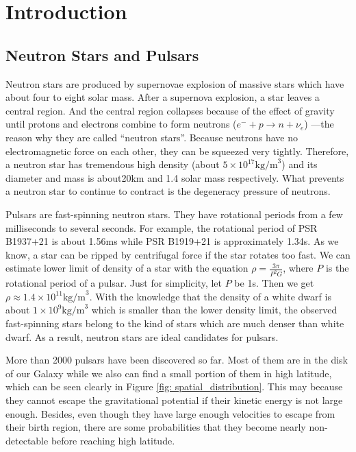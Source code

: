 \documentclass[12pt]{report}
\begin{document}
\listoftables


\chapter{Introduction}   	   
  \section{Neutron Stars and Pulsars}
    Neutron stars are produced by supernovae explosion of massive stars which have about four 
    to eight solar mass. After a supernova explosion, a star leaves a central region. 
    And the central region collapses because of the effect of 
    gravity until protons and electrons combine to form neutrons 
    ($e^{-}+p\rightarrow n+\nu_{e}$) ---the reason why they are called ``neutron stars''.  
    Because neutrons have no electromagnetic force on each other, they can be squeezed very 
    tightly. Therefore, a neutron star has tremendous high density 
    (about $5\times 10^{17} \mbox{kg/m}^3$) and its diameter and mass is about20km and 
    1.4 solar mass respectively. What
    prevents a neutron star to continue to contract is the degeneracy pressure of neutrons. 
    
    Pulsars are fast-spinning neutron stars. They have rotational periods from a few 
    milliseconds to several seconds. For example, the rotational period of PSR B1937+21 is 
    about 1.56ms while PSR B1919+21 is approximately 1.34s. As we know, a star can be ripped 
    by centrifugal force if the star rotates too fast. We can estimate lower limit of 
    density of a star with the equation $\rho=\frac{3\pi}{P^2G}$, where $P$ is the 
    rotational period of a pulsar. Just for simplicity, let $P$ be 1s. Then we 
    get $\rho\approx 1.4\times 10^{11}\mbox{kg/m}^3$. With the knowledge that the 
    density of a white dwarf is about $1\times 10^9\mbox{kg/m}^3$ which is smaller than 
    the lower density limit, the observed fast-spinning stars belong to the kind of stars 
    which are much denser than white dwarf. As a result, neutron stars are ideal candidates 
    for pulsars. 
    
    More than 2000 pulsars have been discovered so far. Most of them are in the disk of 
    our Galaxy while we also can find a small portion of them in high latitude, which can be 
    seen clearly in Figure \ref{fig: spatial_distribution}. This may 
    because they cannot escape the gravitational potential if their kinetic energy is not 
    large enough. Besides, even though they have large enough velocities to escape from their 
    birth region, there are some probabilities that they become nearly non-detectable before 
    reaching high latitude. 
\end{document}
